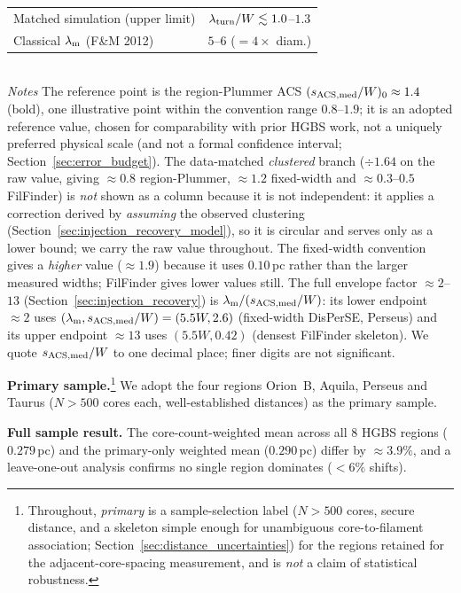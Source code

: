 \documentclass[usenatbib,twoside,twocolumn]{mnras}
\begin{document}
\begin{table}
\begin{tabular}{p{4.6cm}cc}
Matched simulation (upper limit) & \multicolumn{2}{c}{$\lambda_{\rm turn}/W\lesssim1.0$--$1.3$} \\
Classical $\lambda_{\rm m}$ (F\&M 2012) & \multicolumn{2}{c}{$5$--$6$ ($=4\times$ diam.)} \\
\bottomrule
\end{tabular}
\\[2pt]
\footnotesize
\emph{Notes} The reference point is the region-Plummer ACS $(s_{\rm ACS,med}/W)_0\approx1.4$ (bold), one illustrative point within the convention range $0.8$--$1.9$; it is an adopted reference value, chosen for comparability with prior HGBS work, not a uniquely preferred physical scale (and not a formal confidence interval; Section~\ref{sec:error_budget}). The data-matched \emph{clustered} branch ($\div1.64$ on the raw value, giving $\approx0.8$ region-Plummer, $\approx1.2$ fixed-width and $\approx0.3$--$0.5$ FilFinder) is \emph{not} shown as a column because it is not independent: it applies a correction derived by \emph{assuming} the observed clustering (Section~\ref{sec:injection_recovery_model}), so it is circular and serves only as a lower bound; we carry the raw value throughout. The fixed-width convention gives a \emph{higher} value ($\approx1.9$) because it uses $0.10$\,pc rather than the larger measured widths; FilFinder gives lower values still. The full envelope factor $\approx2$--$13$ (Section~\ref{sec:injection_recovery}) is $\lambda_{\rm m}/(s_{\rm ACS,med}/W)$: its lower endpoint $\approx2$ uses $(\lambda_{\rm m},s_{\rm ACS,med}/W)=(5.5W,2.6)$ (fixed-width DisPerSE, Perseus) and its upper endpoint $\approx13$ uses $(5.5W,0.42)$ (densest FilFinder skeleton). We quote $s_{\rm ACS,med}/W$ to one decimal place; finer digits are not significant.
\end{table}

\textbf{Primary sample.}\footnote{Throughout, \emph{primary} is a sample-selection label ($N>500$ cores, secure distance, and a skeleton simple enough for unambiguous core-to-filament association; Section~\ref{sec:distance_uncertainties}) for the regions retained for the adjacent-core-spacing measurement, and is \emph{not} a claim of statistical robustness.} We adopt the four regions Orion~B, Aquila, Perseus and Taurus ($N>500$ cores each, well-established distances) as the primary sample.

\textbf{Full sample result.} The core-count-weighted mean across all 8 HGBS regions ($0.279$\,pc) and the primary-only weighted mean ($0.290$\,pc) differ by $\approx3.9\%$, and a leave-one-out analysis confirms no single region dominates ($<6\%$ shifts).
\end{document}
